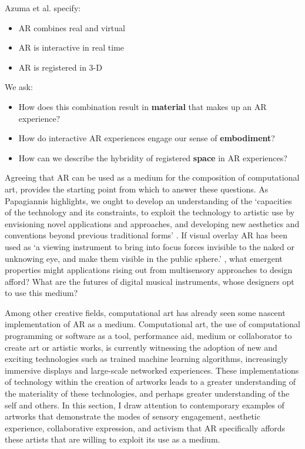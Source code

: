 Azuma et al. specify:
\begin{itemize}
    \item AR combines real and virtual
    \item AR is interactive in real time
    \item AR is registered in 3-D
\end{itemize}
We ask:
\begin{itemize}
    \item How does this combination result in \textbf{material} that makes up an AR experience?
    \item How do interactive AR experiences engage our sense of \textbf{embodiment}?
    \item How can we describe the hybridity of registered \textbf{space} in AR experiences?
\end{itemize}

Agreeing that AR can be used as a medium for the composition of computational art, provides the starting point from which to answer these questions. As Papagiannis highlights, we ought to develop an understanding of the `capacities of the technology and its constraints, to exploit the technology to artistic use by envisioning novel applications and approaches, and developing new aesthetics and conventions beyond previous traditional forms' \citeyearpar{papagiannis2017}. If visual overlay AR has been used as `a viewing instrument to bring into focus forces invisible to the naked or unknowing eye, and make them visible in the public sphere.' \citep{thiel2011}, what emergent properties might applications rising out from multisensory approaches to design afford? What are the futures of digital musical instruments, whose designers opt to use this medium? 

Among other creative fields, computational art has already seen some nascent implementation of AR as a medium. Computational art, the use of computational programming or software as a tool, performance aid, medium or collaborator to create art or artistic works, is currently witnessing the adoption of new and exciting technologies such as trained machine learning algorithms, increasingly immersive displays and large-scale networked experiences. These implementations of technology within the creation of artworks leads to a greater understanding of the materiality of these technologies, and perhaps greater understanding of the self and others. In this section, I draw attention to contemporary examples of artworks that demonstrate the modes of sensory engagement, aesthetic experience, collaborative expression, and activism that AR specifically affords these artists that are willing to exploit its use as a medium.

